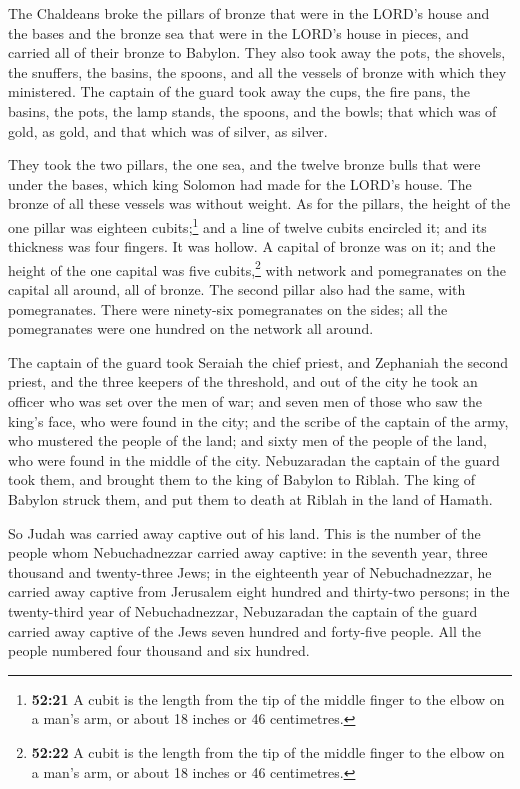  The Chaldeans broke the pillars of bronze that were in
the LORD's house and the bases and the bronze sea that were in the
LORD's house in pieces, and carried all of their bronze to Babylon.
 They also took away the pots, the shovels, the snuffers,
the basins, the spoons, and all the vessels of bronze with which they
ministered.  The captain of the guard took away the cups,
the fire pans, the basins, the pots, the lamp stands, the spoons, and
the bowls; that which was of gold, as gold, and that which was of
silver, as silver.

 They took the two pillars, the one sea, and the twelve
bronze bulls that were under the bases, which king Solomon had made for
the LORD's house. The bronze of all these vessels was without weight.
 As for the pillars, the height of the one pillar was
eighteen cubits;\footnote{\textbf{52:21} A cubit is the length from the
  tip of the middle finger to the elbow on a man's arm, or about 18
  inches or 46 centimetres.} and a line of twelve cubits encircled it;
and its thickness was four fingers. It was hollow.  A
capital of bronze was on it; and the height of the one capital was five
cubits,\footnote{\textbf{52:22} A cubit is the length from the tip of
  the middle finger to the elbow on a man's arm, or about 18 inches or
  46 centimetres.} with network and pomegranates on the capital all
around, all of bronze. The second pillar also had the same, with
pomegranates.  There were ninety-six pomegranates on the
sides; all the pomegranates were one hundred on the network all around.

 The captain of the guard took Seraiah the chief priest,
and Zephaniah the second priest, and the three keepers of the threshold,
 and out of the city he took an officer who was set over
the men of war; and seven men of those who saw the king's face, who were
found in the city; and the scribe of the captain of the army, who
mustered the people of the land; and sixty men of the people of the
land, who were found in the middle of the city. 
Nebuzaradan the captain of the guard took them, and brought them to the
king of Babylon to Riblah.  The king of Babylon struck
them, and put them to death at Riblah in the land of Hamath.

So Judah was carried away captive out of his land.  This
is the number of the people whom Nebuchadnezzar carried away captive: in
the seventh year, three thousand and twenty-three Jews; 
in the eighteenth year of Nebuchadnezzar, he carried away captive from
Jerusalem eight hundred and thirty-two persons;  in the
twenty-third year of Nebuchadnezzar, Nebuzaradan the captain of the
guard carried away captive of the Jews seven hundred and forty-five
people. All the people numbered four thousand and six hundred.

